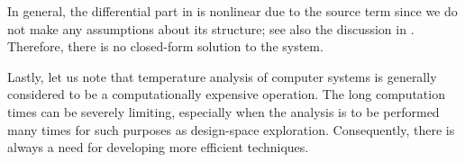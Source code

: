 In general, the differential part in  is
nonlinear due to the source term \vp since we do not make any assumptions about
its structure; see also the discussion in . Therefore, there
is no closed-form solution to the system.

Lastly, let us note that temperature analysis of computer systems is generally
considered to be a computationally expensive operation. The long computation
times can be severely limiting, especially when the analysis is to be performed
many times for such purposes as design-space exploration. Consequently, there is
always a need for developing more efficient techniques.
